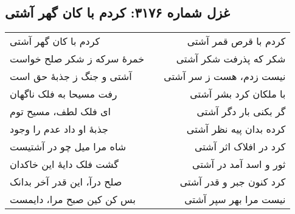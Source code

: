 \begin{center}
\section*{غزل شماره ۳۱۷۶: کردم با کان گهر آشتی}
\label{sec:3176}
\begin{longtable}{l p{0.5cm} r}
کردم با کان گهر آشتی
&&
کردم با قرص قمر آشتی
\\
خمرهٔ سرکه ز شکر صلح خواست
&&
شکر که پذرفت شکر آشتی
\\
آشتی و جنگ ز جذبهٔ حق است
&&
نیست زدم، هست ز سر آشتی
\\
رفت مسیحا به فلک ناگهان
&&
با ملکان کرد بشر آشتی
\\
ای فلک لطف، مسیح توم
&&
گر بکنی بار دگر آشتی
\\
جذبهٔ او داد عدم را وجود
&&
کرده بدان پیه نظر آشتی
\\
شاه مرا میل چو در آشتیست
&&
کرد در افلاک اثر آشتی
\\
گشت فلک دایهٔ این خاکدان
&&
ثور و اسد آمد در آشتی
\\
صلح درآ، این قدر آخر بدانک
&&
کرد کنون جبر و قدر آشتی
\\
بس کن کین صبح مرا، دایمست
&&
نیست مرا بهر سپر آشتی
\\
\end{longtable}
\end{center}
